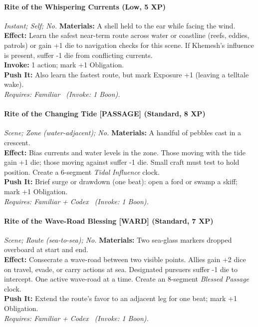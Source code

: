 \paragraph*{Rite of the Whispering Currents (Low, 5 XP)} \emph{Instant; Self; No.}
\textbf{Materials:} A shell held to the ear while facing the wind.\\
\textbf{Effect:} Learn the safest near-term route across water or coastline (reefs, eddies, patrols) or gain +1 die to navigation checks for this scene. If Khemesh's influence is present, suffer -1 die from conflicting currents.\\
\textbf{Invoke:} 1 action; mark +1 Obligation.\\
\textbf{Push It:} Also learn the fastest route, but mark Exposure +1 (leaving a telltale wake).\\
\emph{Requires: Familiar \ (\textit{Invoke:} 1 Boon).}

\paragraph{Rite of the Changing Tide \textnormal{[PASSAGE]} (Standard, 8 XP)} \emph{Scene; Zone (water-adjacent); No.}
\textbf{Materials:} A handful of pebbles cast in a crescent.\\
\textbf{Effect:} Bias currents and water levels in the zone. Those moving with the tide gain +1 die; those moving against suffer -1 die. Small craft must test to hold position. Create a 6-segment \emph{Tidal Influence} clock.\\
\textbf{Push It:} Brief surge or drawdown (one beat): open a ford or swamp a skiff; mark +1 Obligation.\\
\emph{Requires: Familiar + Codex \ (\textit{Invoke:} 1 Boon).}

\paragraph{Rite of the Wave-Road Blessing \textnormal{[WARD]} (Standard, 7 XP)} \emph{Scene; Route (sea-to-sea); No.}
\textbf{Materials:} Two sea-glass markers dropped overboard at start and end.\\
\textbf{Effect:} Consecrate a wave-road between two visible points. Allies gain +2 dice on travel, evade, or carry actions at sea. Designated pursuers suffer -1 die to intercept. One active wave-road at a time. Create an 8-segment \emph{Blessed Passage} clock.\\
\textbf{Push It:} Extend the route's favor to an adjacent leg for one beat; mark +1 Obligation.\\
\emph{Requires: Familiar + Codex \ (\textit{Invoke:} 1 Boon).}

